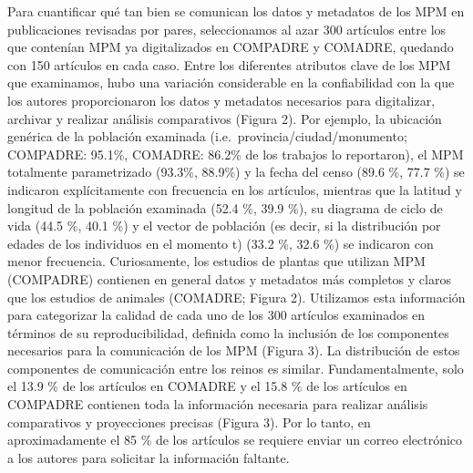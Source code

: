 \documentclass[
  12pt,
  letterpaper,
]{book}
\begin{document}
Para cuantificar qué tan bien se comunican los datos y metadatos de los
MPM en publicaciones revisadas por pares, seleccionamos al azar 300
artículos entre los que contenían MPM ya digitalizados en COMPADRE y
COMADRE, quedando con 150 artículos en cada caso. Entre los diferentes
atributos clave de los MPM que examinamos, hubo una variación
considerable en la confiabilidad con la que los autores proporcionaron
los datos y metadatos necesarios para digitalizar, archivar y realizar
análisis comparativos (Figura 2). Por ejemplo, la ubicación genérica de
la población examinada (i.e.~provincia/ciudad/monumento; COMPADRE:
95.1\%, COMADRE: 86.2\% de los trabajos lo reportaron), el MPM
totalmente parametrizado (93.3\%, 88.9\%) y la fecha del censo (89.6 \%,
77.7 \%) se indicaron explícitamente con frecuencia en los artículos,
mientras que la latitud y longitud de la población examinada (52.4 \%,
39.9 \%), su diagrama de ciclo de vida (44.5 \%, 40.1 \%) y el vector de
población (es decir, si la distribución por edades de los individuos en
el momento t) (33.2 \%, 32.6 \%) se indicaron con menor frecuencia.
Curiosamente, los estudios de plantas que utilizan MPM (COMPADRE)
contienen en general datos y metadatos más completos y claros que los
estudios de animales (COMADRE; Figura 2). Utilizamos esta información
para categorizar la calidad de cada uno de los 300 artículos examinados
en términos de su reproducibilidad, definida como la inclusión de los
componentes necesarios para la comunicación de los MPM (Figura 3). La
distribución de estos componentes de comunicación entre los reinos es
similar. Fundamentalmente, solo el 13.9 \% de los artículos en COMADRE y
el 15.8 \% de los artículos en COMPADRE contienen toda la información
necesaria para realizar análisis comparativos y proyecciones precisas
(Figura 3). Por lo tanto, en aproximadamente el 85 \% de los artículos
se requiere enviar un correo electrónico a los autores para solicitar la
información faltante.
\end{document}
